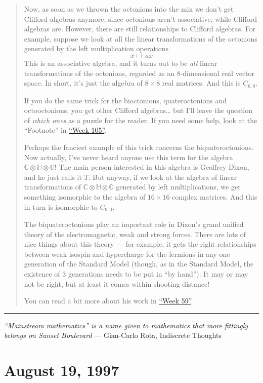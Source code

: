 \documentclass{article}
\begin{document}
\begin{quote}
Now, as soon as we thrown the octonions into the mix we don't get
Clifford algebras anymore, since octonions aren't associative, while
Clifford algebras are. However, there are still relationships to
Clifford algebras. For example, suppose we look at all the linear
transformations of the octonions generated by the left multiplication
operations \[x \mapsto ax\] This is an associative algebra, and it turns
out to be \emph{all} linear transformations of the octonions, regarded
as an 8-dimensional real vector space. In short, it's just the algebra
of \(8\times8\) real matrices. And this is \(C_{6,0}\).

If you do the same trick for the bioctonions, quateroctonions and
octooctonions, you get other Clifford algebras\ldots{} but I'll leave
the question of \emph{which ones} as a puzzle for the reader. If you
need some help, look at the ``Footnote'' in
\protect\hyperlink{week105}{``Week 105''}.

Perhaps the fanciest example of this trick concerns the
biquateroctonions. Now actually, I've never heard anyone use this term
for the algebra \(\mathbb{C}\otimes\mathbb{H}\otimes\mathbb{O}\)! The
main person interested in this algebra is Geoffrey Dixon, and he just
calls it \(T\). But anyway, if we look at the algebra of linear
transformations of \(\mathbb{C}\otimes\mathbb{H}\otimes\mathbb{O}\)
generated by left multiplications, we get something isomorphic to the
algebra of \(16\times16\) complex matrices. And this in turn is
isomorphic to \(C_{9,0}\).

The biquateroctonions play an important role in Dixon's grand unified
theory of the electromagnetic, weak and strong forces. There are lots of
nice things about this theory --- for example, it gets the right
relationships between weak isospin and hypercharge for the fermions in
any one generation of the Standard Model (though, as in the Standard
Model, the existence of 3 generations needs to be put in ``by hand'').
It may or may not be right, but at least it comes within shooting
distance!

You can read a bit more about his work in
\protect\hyperlink{week59}{``Week 59''}.
\end{quote}

\begin{center}\rule{0.5\linewidth}{0.5pt}\end{center}

\emph{``Mainstream mathematics'' is a name given to mathematics that
more fittingly belongs on Sunset Boulevard} --- Gian-Carlo Rota,
Indiscrete Thoughts
\hypertarget{week107}{%
\section{August 19, 1997}\label{week107}}
\end{document}
